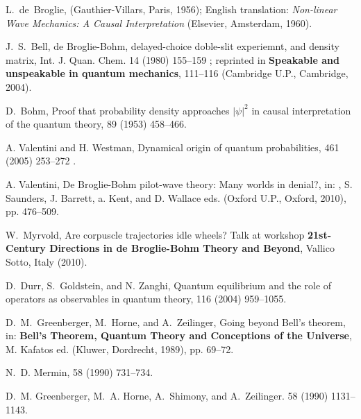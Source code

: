 \documentclass[preprint,tightenlines]{elsarticle}
\begin{document}
\begin{thebibliography}{40}
L.~de~Broglie,
\newblock (Gauthier-Villars, Paris, 1956);
\newblock English translation: {\em Non-linear Wave Mechanics: A Causal
  Interpretation} (Elsevier, Amsterdam, 1960).

J.~S.~Bell,
\newblock de Broglie-Bohm, delayed-choice doble-slit experiemnt, and density matrix,
\newblock Int. J. Quan. Chem.  14 (1980) 155--159 ;
 \newblock reprinted in {\bf Speakable and unspeakable in quantum mechanics}, 111--116  (Cambridge U.P., Cambridge, 2004).

D.~Bohm,
\newblock Proof that probability density approaches $|\psi|^{2}$ in causal
  interpretation of the quantum theory,
   89  (1953) 458--466.

A. Valentini and H. Westman,
\newblock Dynamical origin of quantum probabilities,
  461 (2005) 253--272 .

A. Valentini,
\newblock De Broglie-Bohm pilot-wave theory: Many worlds in denial?, in:
,  S. Saunders, J. Barrett, a. Kent, and D. Wallace eds. (Oxford U.P., Oxford, 2010), pp. 476--509.


W.~Myrvold,
\newblock Are corpuscle trajectories idle wheels?
\newblock Talk at workshop {\bf 21st-Century
  Directions in de Broglie-Bohm Theory and Beyond}, Vallico Sotto,
  Italy (2010).

D.~Durr, S.~Goldstein, and N. Zanghi,
\newblock Quantum equilibrium and the role of operators as observables in
  quantum theory,
  116  (2004) 959--1055.

D.~M.~Greenberger, M.~Horne, and A.~Zeilinger,
\newblock Going beyond Bell's theorem, in: {\bf Bell's Theorem, Quantum Theory
  and Conceptions of the Universe},   M. Kafatos ed. (Kluwer, Dordrecht, 1989), pp. 69--72.


N.~D. Mermin,
 58 (1990) 731--734.

D.~M. Greenberger, M.~A. Horne, A.~Shimony, and A.~Zeilinger.
  58 (1990) 1131--1143.


\end{thebibliography}
\end{document}

